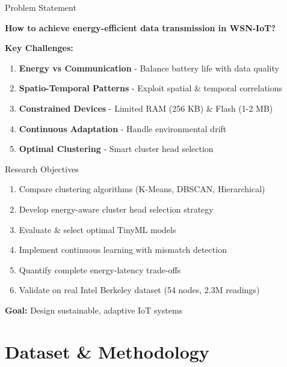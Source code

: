 \documentclass[aspectratio=169]{beamer}
\begin{document}
\begin{frame}{Problem Statement}
\begin{center}
\Large \textcolor{iiitlblue}{\textbf{How to achieve energy-efficient data transmission in WSN-IoT?}}
\end{center}

\vspace{0.5cm}
\textbf{Key Challenges:}
\begin{enumerate}
    \item \textbf{Energy vs Communication} - Balance battery life with data quality
    \item \textbf{Spatio-Temporal Patterns} - Exploit spatial \& temporal correlations
    \item \textbf{Constrained Devices} - Limited RAM (256 KB) \& Flash (1-2 MB)
    \item \textbf{Continuous Adaptation} - Handle environmental drift
    \item \textbf{Optimal Clustering} - Smart cluster head selection
\end{enumerate}
\end{frame}

\begin{frame}{Research Objectives}
\begin{enumerate}
    \item Compare clustering algorithms (K-Means, DBSCAN, Hierarchical)
    \item Develop energy-aware cluster head selection strategy
    \item Evaluate \& select optimal TinyML models
    \item Implement continuous learning with mismatch detection
    \item Quantify complete energy-latency trade-offs
    \item Validate on real Intel Berkeley dataset (54 nodes, 2.3M readings)
\end{enumerate}

\vspace{0.5cm}
\begin{center}
\colorbox{iiitlblue!20}{\textbf{Goal:} Design sustainable, adaptive IoT systems}
\end{center}
\end{frame}

\section{Dataset \& Methodology}
\end{document}

